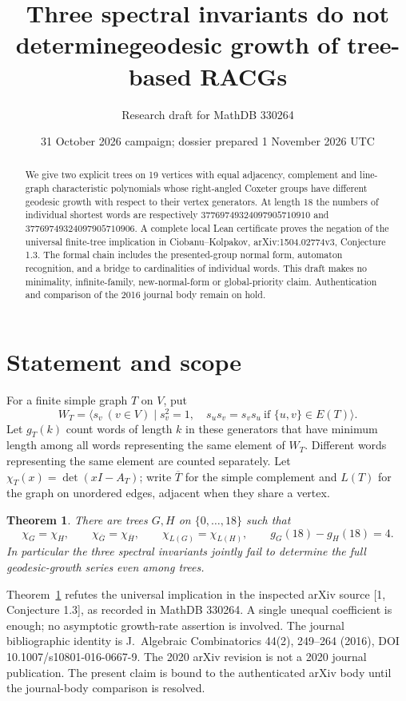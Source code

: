 \documentclass[11pt]{article}
\title{Three spectral invariants do not determine\newline geodesic growth of tree-based RACGs}
\author{Research draft for MathDB 330264}
\date{31 October 2026 campaign; dossier prepared 1 November 2026 UTC}
\newtheorem{theorem}{Theorem}
\begin{document}
\maketitle
\begin{abstract}
We give two explicit trees on 19 vertices with equal adjacency, complement and line-graph characteristic polynomials whose right-angled Coxeter groups have different geodesic growth with respect to their vertex generators. At length 18 the numbers of individual shortest words are respectively
\(37769749324097905710910\) and \(37769749324097905710906\).
A complete local Lean certificate proves the negation of the universal finite-tree implication in Ciobanu--Kolpakov, arXiv:1504.02774v3, Conjecture 1.3. The formal chain includes the presented-group normal form, automaton recognition, and a bridge to cardinalities of individual words. This draft makes no minimality, infinite-family, new-normal-form or global-priority claim. Authentication and comparison of the 2016 journal body remain on hold.
\end{abstract}
\section{Statement and scope}
For a finite simple graph \(T\) on \(V\), put
\[
 W_T=\langle s_v\ (v\in V)\mid s_v^2=1,\quad
 s_us_v=s_vs_u\ \text{if }\{u,v\}\in E(T)\rangle.
\]
Let \(g_T(k)\) count words of length \(k\) in these generators that have minimum length among all words representing the same element of \(W_T\). Different words representing the same element are counted separately. Let \(\chi_T(x)=\det(xI-A_T)\); write \(\overline T\) for the simple complement and \(L(T)\) for the graph on unordered edges, adjacent when they share a vertex.
\begin{theorem}\label{thm}
There are trees \(G,H\) on \(\{0,\ldots,18\}\) such that
\[
\chi_G=\chi_H,\qquad \chi_{\overline G}=\chi_{\overline H},\qquad
\chi_{L(G)}=\chi_{L(H)},\qquad g_G(18)-g_H(18)=4.
\]
In particular the three spectral invariants jointly fail to determine the full geodesic-growth series even among trees.
\end{theorem}
Theorem~\ref{thm} refutes the universal implication in the inspected arXiv source [1, Conjecture 1.3], as recorded in MathDB 330264. A single unequal coefficient is enough; no asymptotic growth-rate assertion is involved. The journal bibliographic identity is J.~Algebraic Combinatorics 44(2), 249--264 (2016), DOI 10.1007/s10801-016-0667-9. The 2020 arXiv revision is not a 2020 journal publication. The present claim is bound to the authenticated arXiv body until the journal-body comparison is resolved.
\newpage
\end{document}
